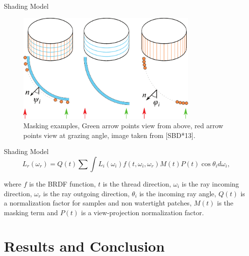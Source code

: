 \documentclass{beamer}
\begin{document}
\begin{frame}{Shading Model}
\begin{figure}[b!]
\includegraphics[width=0.8\textwidth]{img/masking}
\caption*{\tiny{Masking examples, Green arrow points view from above, red arrow points view at grazing angle, image taken from [SBD*13].}}
\end{figure}
\end{frame}

\begin{frame}{Shading Model}
\begin{equation*}
L_r(\omega_r) = Q(t) \sum \int L_i(\omega_i) f(t, \omega_i, \omega_r) M(t) P(t) \cos \theta_i d \omega_i,
\end{equation*}

\footnotesize{where $f$ is the BRDF function, $t$ is the thread direction, $\omega_i$ is the ray incoming direction, $\omega_r$ is the ray outgoing direction, $\theta_i$ is the incoming ray angle, $Q(t)$ is a normalization factor for samples and non watertight patches, $M(t)$ is the masking term and $P(t)$ is a view-projection normalization factor.}
\end{frame}

\section{Results and Conclusion}
\subsection{ }
\end{document}
